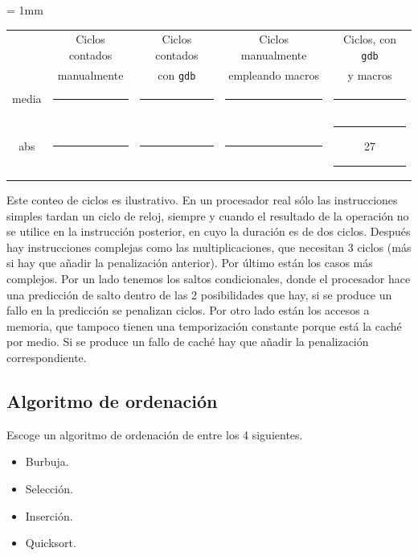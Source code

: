 \begin{center}
\small
\colorbox[gray]{0.9}{
\tabcolsep = 1mm
\begin{tabular}{ccccc}
&Ciclos contados & Ciclos contados & Ciclos manualmente & Ciclos, con {\tt gdb} \\
&manualmente & con {\tt gdb}       & empleando macros & y macros \\
media &
\colorbox[gray]{1}{\rule{0cm}{0.46cm}\rule{2.6cm}{0cm}} &
\colorbox[gray]{1}{\rule{0cm}{0.46cm}\rule{2.6cm}{0cm}} &
\colorbox[gray]{1}{\rule{0cm}{0.46cm}\rule{2.6cm}{0cm}} &
\colorbox[gray]{1}{\rule{0cm}{0.46cm}\rule{2.6cm}{0cm}} \\[1mm]
abs &
\colorbox[gray]{1}{\rule{0cm}{0.46cm}\rule{2.6cm}{0cm}} &
\colorbox[gray]{1}{\rule{0cm}{0.46cm}\rule{2.6cm}{0cm}} &
\colorbox[gray]{1}{\rule{0cm}{0.46cm}\rule{2.6cm}{0cm}} &
\colorbox[gray]{1}{\rule{0cm}{0.46cm}\rule{1.1cm}{0cm}27\rule{1.1cm}{0cm}} \\
\end{tabular}
\vspace{0.5ex}
}
\end{center}

Este conteo de ciclos es ilustrativo. En un procesador real sólo
las instrucciones simples tardan un ciclo de reloj, siempre y cuando
el resultado de la operación no se utilice en la instrucción posterior,
en cuyo la duración es de dos ciclos. Después hay instrucciones
complejas como las multiplicaciones, que necesitan 3 ciclos (más si hay
que añadir la penalización anterior). Por último están los casos 
más complejos. Por un lado tenemos los saltos condicionales, donde el
procesador hace una predicción de salto dentro de las 2 posibilidades
que hay, si se produce un fallo en la predicción se penalizan ciclos.
Por otro lado están los accesos a memoria, que tampoco tienen una
temporización constante porque está la caché por medio. Si se produce
un fallo de caché hay que añadir la penalización correspondiente.

\subsection{Algoritmo de ordenación}

Escoge un algoritmo de ordenación de entre los 4 siguientes.

\begin{itemize}
  \item Burbuja.
  \item Selección.
  \item Inserción.
  \item Quicksort.
\end{itemize}

